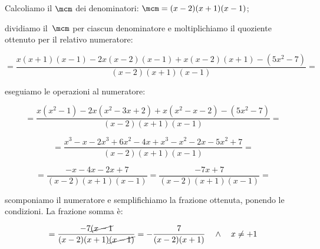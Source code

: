 \begin{exrig}
\begin{esempio}
\begin{enumeratea}
 \item Calcoliamo il $\mcm$ dei denominatori: 
  $\mcm=(x-2)(x+1)(x-1)$;
  
 \item dividiamo il~$\mcm$ per ciascun denominatore e moltiplichiamo il 
  quoziente ottenuto per il relativo numeratore:
  
 \[=\frac{x(x+1)(x-1)-2x(x-2)(x-1)+x(x-2)(x+1)-(5x^{2}-7)}{(x-2)(x+1)(x-1)}=\]
 
 
 \item eseguiamo le operazioni al numeratore:
 
  \[=\frac{x(x^2-1)-2x(x^2-3x+2)+x(x^2-x-2)-(5x^{2}-7)}{(x-2)(x+1)(x-1)} = \]
  
  \[=\frac{x^3-x-2x^3+6x^2-4x+x^3-x^2-2x-5x^2+7}{(x-2)(x+1)(x-1)}=\]
 
  \[=\frac{-x-4x-2x+7}{(x-2)(x+1)(x-1)}=\frac{-7x+7}{(x-2)(x+1)(x-1)}=\]
 
 \item scomponiamo il numeratore e semplifichiamo la frazione ottenuta, 
  ponendo le condizioni. La frazione somma è:
 
  \[=\frac{-7\cancel{(x-1}}{(x-2)(x+1)\cancel{(x-1)}}=
    -{\frac{7}{(x-2)(x+1)}} \quad \wedge \quad x \neq +1\]
 
 \end{enumeratea}
 \end{esempio}

\end{exrig}
% 
% 
% 
% 
% 
